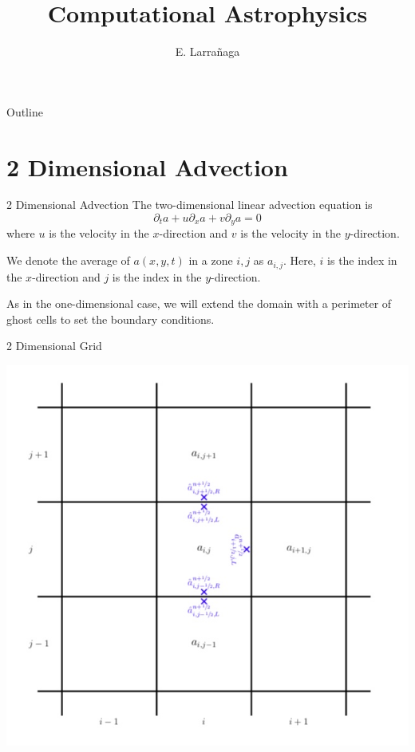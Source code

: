 \documentclass[11pt]{beamer}
\begin{document}
\begin{frame}
\title{Computational Astrophysics}
\author{E. Larrañaga}
\titlepage
\end{frame}

\begin{frame}{Outline}
\tableofcontents
\end{frame}

\section{2 Dimensional Advection}
\begin{frame}[fragile]{2 Dimensional Advection}
The two-dimensional linear advection equation is
\begin{equation}
\partial_t a + u \partial_x a + v \partial_y a = 0
\label{eq:advect2d}
\end{equation}
where $u$ is the velocity in the $x$-direction and $v$ is the velocity in
the $y$-direction.  
\bigskip

We denote the average of $a(x,y,t)$ in a zone $i,j$ as
$a_{i,j}$.  Here, $i$ is the index in the $x$-direction and $j$ is the
index in the $y$-direction.
\bigskip 

As in the one-dimensional case, we will extend the domain with a
perimeter of ghost cells to set the boundary conditions.
\end{frame}

\begin{frame}[fragile]{2 Dimensional Grid}
\begin{center}
\includegraphics[scale=0.3]{2DGrid}
\end{center}
\end{frame}
\end{document}
